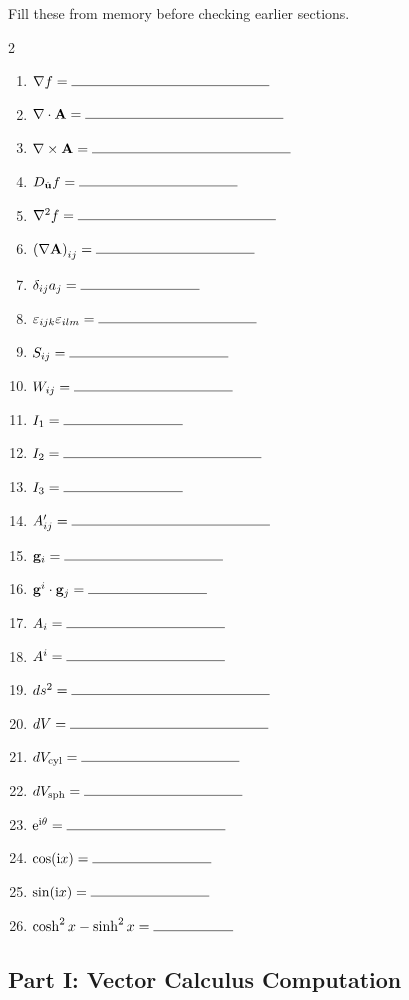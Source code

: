 \documentclass{otscience}
\begin{document}
\begin{summarybox}
Fill these from memory before checking earlier sections.
\begin{multicols}{2}
\begin{enumerate}
\item \(\nabla f=\blank[5cm]\)
\item \(\nabla\cdot\mathbf{A}=\blank[5cm]\)
\item \(\nabla\times\mathbf{A}=\blank[5cm]\)
\item \(D_{\hat{\mathbf{u}}}f=\blank[4cm]\)
\item \(\nabla^2 f=\blank[5cm]\)
\item \({(\nabla\mathbf{A})}_{ij}=\blank[4cm]\)
\item \(\delta_{ij}a_j=\blank[3cm]\)
\item \(\varepsilon_{ijk}\varepsilon_{ilm}=\blank[4cm]\)
\item \(S_{ij}=\blank[4cm]\)
\item \(W_{ij}=\blank[4cm]\)
\item \(I_1=\blank[3cm]\)
\item \(I_2=\blank[5cm]\)
\item \(I_3=\blank[3cm]\)
\item \(A'_{ij}=\blank[5cm]\)
\item \(\mathbf{g}_i=\blank[4cm]\)
\item \(\mathbf{g}^i\cdot\mathbf{g}_j=\blank[3cm]\)
\item \(A_i=\blank[4cm]\)
\item \(A^i=\blank[4cm]\)
\item \(ds^2=\blank[5cm]\)
\item \(dV=\blank[5cm]\)
\item \(dV_{\text{cyl}}=\blank[4cm]\)
\item \(dV_{\text{sph}}=\blank[4cm]\)
\item \(\ee^{\ii\theta}=\blank[4cm]\)
\item \(\cos(\ii x)=\blank[3cm]\)
\item \(\sin(\ii x)=\blank[3cm]\)
\item \(\cosh^2x-\sinh^2x=\blank[2cm]\)
\end{enumerate}
\end{multicols}
\end{summarybox}

\subsection{Part I: Vector Calculus Computation}
\end{document}
